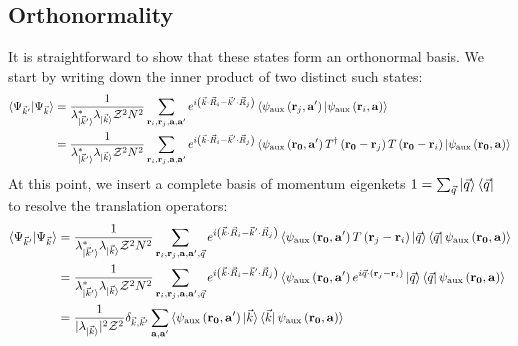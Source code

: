 \documentclass[reprint,hidelinks,onecolumn]{revtex4-2}
\begin{document}
\subsection{Orthonormality}
It is straightforward to show that these states form an orthonormal basis. We start by writing down the inner product of two distinct such states:
\begin{equation}\begin{aligned}
	\braket{\Psi_{\vec k^\prime} | \Psi_{\vec k}} 
	&= \frac{1}{\lambda_{\ket{\vec k^\prime}}^* \lambda_{\ket{\vec k}} \mathcal{Z}^2 N^2}\sum_{{\bf r}_i, {\bf r}_j, {\bf a}, {\bf a}^\prime} e^{i \left(\vec{k}\cdot\vec{R}_i - \vec{k}^\prime\cdot\vec{R}_j\right) } \braket{\psi_\text{aux}\left( {\bf r}_j, {\bf a}^\prime \right) | \psi_\text{aux}\left( {\bf r}_i, {\bf a} \right)} \\
	&= \frac{1}{\lambda_{\ket{\vec k^\prime}}^* \lambda_{\ket{\vec k}} \mathcal{Z}^2 N^2}\sum_{{\bf r}_i, {\bf r}_j, {\bf a}, {\bf a}^\prime} e^{i \left(\vec{k}\cdot\vec{R}_i - \vec{k}^\prime\cdot\vec{R}_j\right) } \braket{\psi_\text{aux}\left( {\bf r_0}, {\bf a}^\prime \right) T^\dagger\left( {\bf r_0} - {\bf r}_j \right) T\left( {\bf r_0} - {\bf r}_i \right) | \psi_\text{aux}\left( {\bf r_0}, {\bf a} \right)}\\
\end{aligned}\end{equation}
At this point, we insert a complete basis of momentum eigenkets \(1 = \sum_{\vec q}\ket{\vec q}\bra{\vec q}\) to resolve the translation operators:
\begin{equation}\begin{aligned}
	\braket{\Psi_{\vec k^\prime} | \Psi_{\vec k}} &= \frac{1}{\lambda_{\ket{\vec k^\prime}}^* \lambda_{\ket{\vec k}} \mathcal{Z}^2 N^2}\sum_{{\bf r}_i, {\bf r}_j, {\bf a}, {\bf a}^\prime, \vec q} e^{i \left(\vec{k}\cdot\vec{R}_i - \vec{k}^\prime\cdot\vec{R}_j\right) } \braket{\psi_\text{aux}\left( {\bf r_0}, {\bf a}^\prime \right) T\left( {\bf r}_j - {\bf r}_i \right) \ket{\vec q}\bra{\vec q} \psi_\text{aux}\left( {\bf r_0}, {\bf a} \right)}\\
						      &= \frac{1}{\lambda_{\ket{\vec k^\prime}}^* \lambda_{\ket{\vec k}} \mathcal{Z}^2 N^2}\sum_{{\bf r}_i, {\bf r}_j, {\bf a}, {\bf a}^\prime, \vec q} e^{i \left(\vec{k}\cdot\vec{R}_i - \vec{k}^\prime\cdot\vec{R}_j\right) } \braket{\psi_\text{aux}\left( {\bf r_0}, {\bf a}^\prime \right) e^{i \vec q \cdot \left( {\bf r}_j - {\bf r}_i \right)} \ket{\vec q}\bra{\vec q} \psi_\text{aux}\left( {\bf r_0}, {\bf a} \right)} \\
						      &= \frac{1}{|\lambda_{\ket{\vec k}}|^2 \mathcal{Z}^2} \delta_{\vec k, \vec k^\prime}\sum_{{\bf a}, {\bf a}^\prime}\braket{\psi_\text{aux}\left( {\bf r_0}, {\bf a}^\prime \right) \ket{\vec k}\bra{\vec k} \psi_\text{aux}\left( {\bf r_0}, {\bf a} \right)}\\
\end{aligned}\end{equation}
\end{document}
